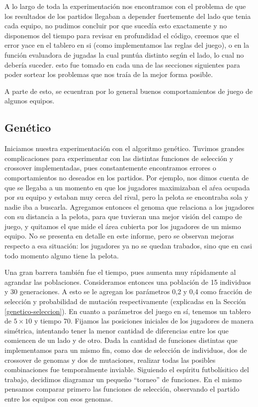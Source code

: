 
A lo largo de toda la experimentación nos encontramos con el problema de que los resultados de los partidos llegaban a depender
fuertemente del lado que tenia cada equipo, no pudimos concluir por que sucedía esto exactamente y no disponemos del tiempo
para revisar en profundidad el código, creemos que el error yace en el tablero en si (como implementamos las reglas del juego),
 o en la función evaluadora de jugadas la cual puntúa distinto según el lado, lo cual no debería suceder.
 esto fue tomado en cada una de las secciones siguientes para poder sortear los problemas que nos traía de la mejor forma posible.


A parte de esto, se ecuentran por lo general buenos comportamientos de juego de algunos equipos.

\subsection{Genético}


Iniciamos nuestra experimentación con el algoritmo genético.
Tuvimos grandes complicaciones para experimentar con las distintas funciones de selección y crossover implementadas, pues constantemente encontramos errores o comportamientos no deseados en los partidos.
Por ejemplo, nos dimos cuenta de que se llegaba a un momento en que los jugadores maximizaban el aŕea ocupada por su equipo y estaban muy cerca del rival, pero la pelota se encontraba sola y nadie iba a buscarla.
Agregamos entonces el genoma que relaciona a los jugadores con su distancia a la pelota, para que tuvieran una mejor visión del campo de juego, y quitamos el que mide el área cubierta por los jugadores de un mismo equipo.
No se presenta en detalle en este informe, pero se observan mejoras respecto a esa situación: los jugadores ya no se quedan trabados, sino que en casi todo momento alguno tiene la pelota.

Una gran barrera también fue el tiempo, pues aumenta muy rápidamente al agrandar las poblaciones.
Consideramos entonces una población de 15 individuos y 30 generaciones. A esto se le agregan los parámetros 0,2 y 0,4 como fracción de selección y probabilidad de mutación respectivamente (explicadas en la Sección \ref{genetico-seleccion}).
En cuanto a parámetros del juego en sí, tenemos un tablero de $5\times10$ y tiempo 70.
Fijamos las posiciones iniciales de los jugadores de manera simétrica, intentando tener la menor cantidad de diferencias entre los que comiencen de un lado y de otro.
Dada la cantidad de funciones distintas que implementamos para un mismo fin, como dos de selección de individuos, dos de crossover de genomas y dos de mutaciones, realizar todas las posibles combinaciones fue temporalmente inviable. Siguiendo el espíritu futbolísitico del trabajo, decidimos diagramar un pequeño ``torneo'' de funciones. En el mismo pensamos comparar primero las funciones de selección, observando el partido entre los equipos con esos genomas.



